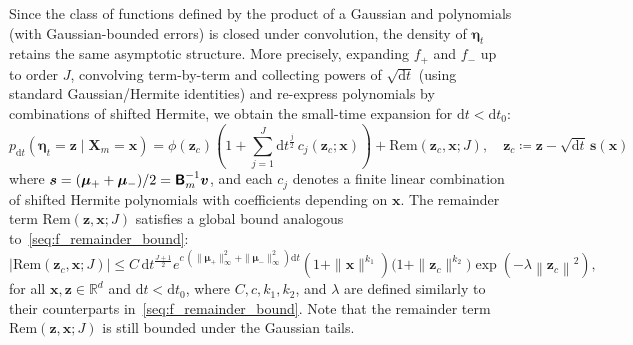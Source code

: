 Since the class of functions defined by the product of a Gaussian and polynomials (with Gaussian-bounded errors) is closed under convolution, the density of $\bm\eta_t$ retains the same asymptotic structure. More precisely, expanding $f_+$ and $f_-$ up to order $J$, convolving term-by-term and collecting powers of $\sqrt{\mathrm dt}$ (using standard Gaussian/Hermite identities) and re-express polynomials by combinations of shifted Hermite, we obtain the small-time expansion for $\mathrm dt<\mathrm dt_0$:
\begin{equation}
    p_{\mathrm dt}(\bm\eta_t=\bm z \mid \bm X_m=\bm x)
    =\phi\!\left(\bm z_c\right)
    \left(1+\sum_{j=1}^{J}\mathrm dt^{\frac{j}{2}}\,
    c_j\!\left(\bm z_c;\bm x\right)\right)
    +\mathrm{Rem}\!\left(\bm z_c,\bm x;J\right),
    \quad
    \bm z_c\coloneqq\bm z-\sqrt{\mathrm dt}\,\bm s(\bm x)
    \label{seq:p_dt_sqrt_dt_expansion}
\end{equation}
where $\bm s=(\bm\mu_++\bm\mu_-)/2=\boldsymbol{\mathsf{B}}_m^{-1}\bm v$, and each $c_j$ denotes a finite linear combination of shifted Hermite polynomials with coefficients depending on $\bm x$. The remainder term $\mathrm{Rem}(\bm z,\bm x;J)$ satisfies a global bound analogous to~\eqref{seq:f_remainder_bound}:
\begin{equation}
    \left\vert\mathrm{Rem}\!\left(\bm z_c,\bm x;J\right)\right\vert
    \leq
    C\,\mathrm dt^{\frac{J+1}{2}}
    e^{c\,\left(\|\bm\mu_+\|_\infty^2+\|\bm\mu_-\|_\infty^2\right)\mathrm dt}
    \!\left(1+\|\bm x\|^{k_1}\right)
    \big(1+\|\bm z_c\|^{k_2}\big)
    \exp\!\left(-\lambda\left\|\bm z_c\right\|^2\right),
    \label{seq:p_remainder_bound}
\end{equation}
for all $\bm x,\bm z\in\mathbb R^d$ and $\mathrm dt<\mathrm dt_0$,
where $C,c,k_1, k_2$, and $\lambda$ are defined similarly to their counterparts in~\eqref{seq:f_remainder_bound}. Note that the remainder term $\mathrm{Rem}(\bm z,\bm x;J)$ is still bounded under the Gaussian tails.

